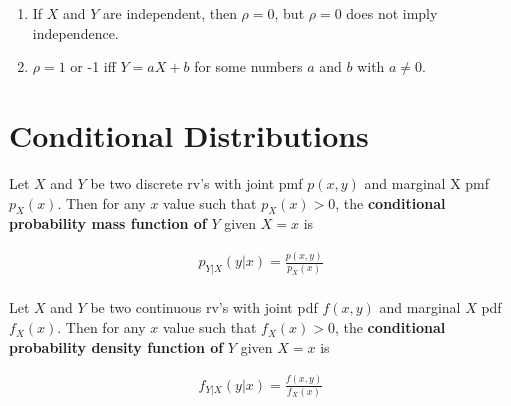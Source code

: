 \begin{proposition}
    \begin{enumerate}
        \item If $X$ and $Y$ are independent, then $\rho=0$, but $\rho=0$ does not imply independence. 
        \item $\rho=1$ or -1 iff $Y=aX+b$ for some numbers $a$ and $b$ with $a\neq 0$.
    \end{enumerate}
\end{proposition}

\section{Conditional Distributions}

\begin{definition}
    Let $X$ and $Y$ be two discrete rv's with joint pmf $p(x,y)$ and marginal X pmf $p_X(x)$. Then for any $x$ value such that $p_X(x) > 0$, the \textbf{conditional probability mass function of} $Y$ given $X = x$ is 
    
    \begin{align*}
        p_{Y|X}(y|x) = \frac{p(x,y)}{p_X(x)} \\
    \end{align*}

    Let $X$ and $Y$ be two continuous rv's with joint pdf $f(x,y)$ and marginal $X$ pdf $f_X(x)$. Then for any $x$ value such that $f_X(x) > 0$, the \textbf{conditional probability density function of} $Y$ given $X=x$ is 
    
    \begin{align*}
        f_{Y|X}(y|x) = \frac{f(x,y)}{f_X(x)} \\
    \end{align*}
\end{definition}

